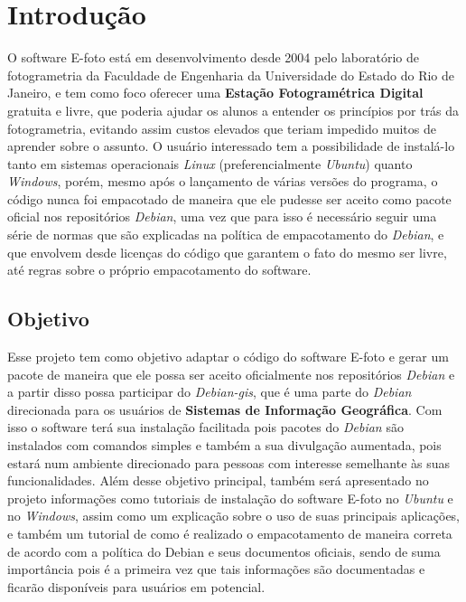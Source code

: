 \chapter*{Introdução}

O software E-foto está em desenvolvimento desde 2004 pelo laboratório de fotogrametria da Faculdade de Engenharia da Universidade do Estado do Rio de Janeiro, e tem como foco oferecer uma \textbf{Estação Fotogramétrica Digital} gratuita e livre, que poderia ajudar os alunos a entender os princípios por trás da fotogrametria, evitando assim custos elevados que teriam impedido muitos de aprender sobre o assunto. O usuário interessado tem a possibilidade de instalá-lo tanto em sistemas operacionais \textit{Linux} (preferencialmente \textit{Ubuntu}) quanto \textit{Windows}, porém, mesmo após o lançamento de várias versões do programa, o código nunca foi empacotado de maneira que ele pudesse ser aceito como pacote oficial nos repositórios \textit{Debian}, uma vez que para isso é necessário seguir uma série de normas que são explicadas na política de empacotamento do \textit{Debian}, e que envolvem desde licenças do código que garantem o fato do mesmo ser livre, até regras sobre o próprio empacotamento do software.

\section*{Objetivo}

Esse projeto tem como objetivo adaptar o código do software E-foto e gerar um pacote  de maneira que ele possa ser aceito oficialmente nos repositórios \textit{Debian} e a partir disso possa participar do \textit{Debian-gis}, que é uma parte do \textit{Debian} direcionada para os usuários de \textbf{Sistemas de Informação Geográfica}. Com isso o software terá sua instalação facilitada pois pacotes do \textit{Debian} são instalados com comandos simples e também a sua divulgação aumentada, pois estará num ambiente direcionado para pessoas com interesse semelhante às suas funcionalidades. Além desse objetivo principal, também será apresentado no projeto informações como tutoriais de instalação do software E-foto no \textit{Ubuntu} e no \textit{Windows}, assim como um explicação sobre o uso de suas principais aplicações, e também um tutorial de como é realizado o empacotamento de maneira correta de acordo com a política do Debian e seus documentos oficiais, sendo de suma importância pois é a primeira vez que tais informações são documentadas e ficarão disponíveis para usuários em potencial.

